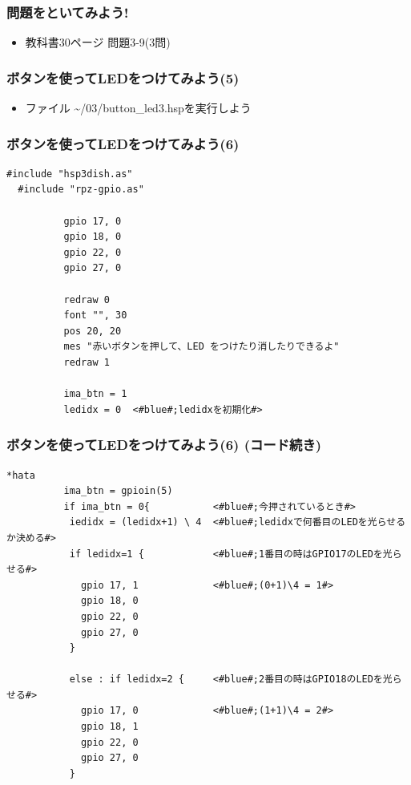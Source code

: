 \begin{frame}
  \frametitle{問題をといてみよう!}
  \begin{itemize}
    \item 教科書30ページ 問題3-9(3問)
  \end{itemize}
\end{frame}

\begin{frame}
  \frametitle{ボタンを使ってLEDをつけてみよう(5)}
  \begin{itemize}
    \item ファイル \rightarrow \sim/03/button\_led3.hspを実行しよう
  \end{itemize}
\end{frame}

\begin{frame}[fragile]
  \frametitle{ボタンを使ってLEDをつけてみよう(6)}
  \begin{lstlisting}[title=button\_led3.hsp, label=button_led3.hsp]
  #include "hsp3dish.as"
  #include "rpz-gpio.as"
  
          gpio 17, 0   
          gpio 18, 0
          gpio 22, 0
          gpio 27, 0

          redraw 0
          font "", 30
          pos 20, 20
          mes "赤いボタンを押して、LED をつけたり消したりできるよ"
          redraw 1

          ima_btn = 1 
          ledidx = 0  <#blue#;ledidxを初期化#>
  \end{lstlisting}
\end{frame}

\begin{frame}[fragile]
  \frametitle{ボタンを使ってLEDをつけてみよう(6) (コード続き)}
  \begin{lstlisting}[title=button\_led3.hsp, label=button_led3.hsp]
  *hata
          ima_btn = gpioin(5)
          if ima_btn = 0{           <#blue#;今押されているとき#>
           iedidx = (ledidx+1) \ 4  <#blue#;ledidxで何番目のLEDを光らせるか決める#>
           if ledidx=1 {            <#blue#;1番目の時はGPIO17のLEDを光らせる#>
             gpio 17, 1             <#blue#;(0+1)\4 = 1#>
             gpio 18, 0 
             gpio 22, 0
             gpio 27, 0
           }

           else : if ledidx=2 {     <#blue#;2番目の時はGPIO18のLEDを光らせる#>
             gpio 17, 0             <#blue#;(1+1)\4 = 2#>
             gpio 18, 1
             gpio 22, 0
             gpio 27, 0
           }
  \end{lstlisting}
\end{frame}


